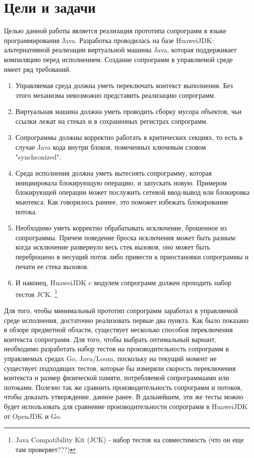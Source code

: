\section{Цели и задачи}
	Целью данной работы является реализация прототипа сопрограмм в языке программирования Java. Разработка
	проводилась на базе HuaweiJDK: альтернативной реализации виртуальной машины Java, которая поддерживает компиляцию перед
	исполнением. Создание сопрограмм в управляемой среде имеет ряд требований. 
	\begin{enumerate}
		\item Управляемая среда должна уметь переключать контекст выполнения. Без этого механизма
		невозможно представить реализацию сопрограмм.
		\item Виртуальная машина должна уметь проводить сборку мусора объектов, чьи ссылки лежат на стеках и в сохраненных
		регистрах сопрограмм. 
		\item Сопрограммы должны корректно работать в критических секциях, то есть в случае Java кода внутри блоков,
		помеченных ключевым словом "synchronized".
		\item Среда исполнения должна уметь вытеснять сопрограмму, которая инициировала блокирующую операцию, и
		запускать новую. Примером блокирующей операции может послужить сетевой ввод-вывод или блокировка мьютекса.
		Как говорилось раннее, это поможет избежать блокирование потока.
		\item Необходимо уметь корректно обрабатывать исключение, брошенное из сопрограммы. Причем поведение броска
		исключения может быть разным: когда исключение развернуло весь стек вызовов, оно может быть переброшено в
		несущий поток либо привести к приостановки сопрограммы и печати ее стека вызовов.
		\item И наконец, HuaweiJDK c модулем сопрограмм должен проходить набор тестов JCK.
		\footnote{Java Compatibility Kit (JCK) - набор тестов на совместимость (что он еще там проверяет???)}
	\end{enumerate}
	
	Для того, чтобы минимальный прототип сопрограмм заработал в управляемой среде исполнения, достаточно реализовать первые два пункта. Как было показано в обзоре предметной области, существует несколько способов
	переключения контекста сопрограмм. Для того, чтобы выбрать оптимальный вариант, необходимо разработать набор тестов на производительность сопрограмм в управляемых средах Go, Java/Loom, поскольку на текущий момент не
	существует подходящих
	тестов, которые бы измеряли скорость переключения контекста и размер физической памяти, потребляемой сопрограммаами или потоками.
	Полезно так же сравнить производительность сопрограмм и потоков, чтобы доказать утверждение, данное ранее. В дальнейшем, эти же
	тесты можно будет использовать для сравнение производительности сопрограмм в HuaweiJDK от OpenJDK и Go.
	

